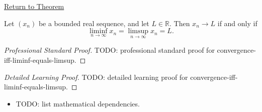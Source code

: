 \newpage
{}
\label{prf:convergence-iff-liminf-equals-limsup}

\begin{remark*}[Return]
\hyperref[thm:convergence-iff-liminf-equals-limsup]{Return to Theorem}
\end{remark*}

\begin{theorem*}
Let $(x_n)$ be a bounded real sequence, and let $L\in\mathbb{R}$. Then
$x_n\to L$ if and only if
\[
  \liminf_{n\to\infty}x_n
  =
  \limsup_{n\to\infty}x_n
  =
  L.
\]

\smallskip
\noindent
\end{theorem*}

\begin{proof}[Professional Standard Proof]
\LRAProofBodyStart
TODO: professional standard proof for convergence-iff-liminf-equals-limsup.
\end{proof}

\begin{proof}[Detailed Learning Proof]
\LRAProofBodyStart
TODO: detailed learning proof for convergence-iff-liminf-equals-limsup.
\end{proof}

\begin{remark*}
\end{remark*}

\begin{dependencies}
\begin{itemize}
  \item TODO: list mathematical dependencies.
\end{itemize}
\end{dependencies}

\clearpage
